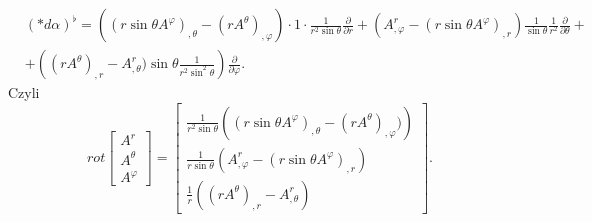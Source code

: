 \documentclass[../main.tex]{subfiles}
\begin{document}
\begin{przyklad}
    \begin{align*}
        &\left( \ast d\alpha \right) ^\flat = \left( (r\sin\theta A^\varphi)_{,\theta} - (r A^\theta)_{,\varphi}\right) \cdot 1\cdot \frac{1}{r^2\sin\theta} \frac{\partial }{\partial r} + \left( A^r_{,\varphi} - (r \sin\theta A^\varphi)_{,r}\right) \frac{1}{\sin\theta} \frac{1}{r^2} \frac{\partial }{\partial \theta} +\\
        &+ \left( (r A^\theta)_{,r} - A^r_{,\theta})\sin\theta \frac{1}{r^2\sin^2\theta} \right) \frac{\partial }{\partial \varphi}
    .\end{align*}
    Czyli
    \[
    rot \begin{bmatrix} A^r \\ A^\theta \\ A^\varphi \end{bmatrix} =
    \begin{bmatrix} \frac{1}{r^2\sin\theta} \left( (r\sin\theta A^\varphi)_{,\theta} - (r A^\theta)_{,\varphi}) \right) \\
    \frac{1}{r\sin\theta} \left( A^r_{,\varphi} - (r\sin\theta A^\varphi)_{,r} \right) \\
\frac{1}{r} \left( (r A^\theta)_{,r} - A^r_{,\theta} \right) \end{bmatrix}
    .\]
\end{przyklad}
\end{document}
